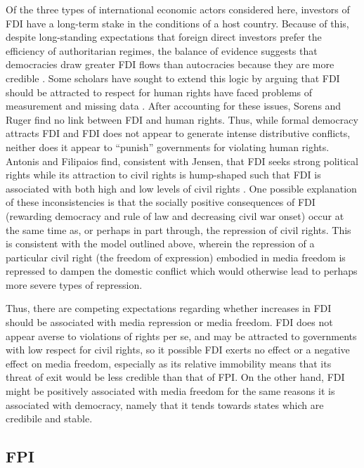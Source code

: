 \documentclass[12pt,a4paper]{article}\usepackage[]{graphicx}\usepackage[]{color}
\begin{document}
Of the three types of international economic actors considered here, investors of FDI have a long-term stake in the conditions of a host country. Because of this, despite long-standing expectations that foreign direct investors prefer the efficiency of authoritarian regimes, the balance of evidence suggests that democracies draw greater FDI flows than autocracies because they are more credible \parencite{Jensen:2003to}. Some scholars have sought to extend this logic by arguing that FDI should be attracted to respect for human rights \parencite{Blanton:2007gu} have faced problems of measurement and missing data \parencite{Sorens:2012hc}. After accounting for these issues, Sorens and Ruger find no link between FDI and human rights. Thus, while formal democracy attracts FDI and FDI does not appear to generate intense distributive conflicts, neither does it appear to “punish” governments for violating human rights. Antonis and Filipaios find, consistent with Jensen, that FDI seeks strong political rights while its attraction to civil rights is hump-shaped such that FDI is associated with both high and low levels of civil rights \parencite*{Adam:2007gn}. One possible explanation of these inconsistencies is that the socially positive consequences of FDI (rewarding democracy and rule of law and decreasing civil war onset) occur at the same time as, or perhaps in part through, the repression of civil rights. This is consistent with the model outlined above, wherein the repression of a particular civil right (the freedom of expression) embodied in media freedom is repressed to dampen the domestic conflict which would otherwise lead to perhaps more severe types of repression.

Thus, there are competing expectations regarding whether increases in FDI should be associated with media repression or media freedom. FDI does not appear averse to violations of rights per se, and may be attracted to governments with low respect for civil rights, so it possible FDI exerts no effect or a negative effect on media freedom, especially as its relative immobility means that its threat of exit would be less credible than that of FPI. On the other hand, FDI might be positively associated with media freedom for the same reasons it is associated with democracy, namely that it tends towards states which are credibile and stable.

\subsection{FPI}
\end{document}
